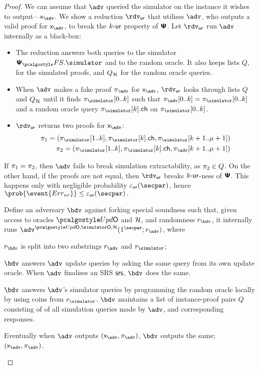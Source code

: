 \begin{proof}
{  We can assume that $\advse$ queried the simulator on the instance it wishes to
  output---$\inp_{\advse}$. We show a reduction $\rdvur$ that utilises $\advse$,
  who outputs a valid proof for $\inp_{\advse}$, to break the ${k\text{-}\mathsf{ur}}$ property of
  $\bm{\mathsf{\Psi}}$. Let $\rdvur$ run $\advse$ internally as a black-box:
\begin{itemize}
	\item The reduction answers both queries to the simulator $\psfs.\simulator$ and to the random oracle. 
	It also keeps lists $Q$, for the simulated proofs, and $Q_{\mathcal{H}}$ for the random oracle queries. 
\item When $\advse$ makes a fake proof $\zkproof_{\advse}$ for $\inp_{\advse}$,
  $\rdvur$ looks through lists $Q$ and $Q_{\mathcal{H}}$ until it finds
  $\zkproof_{\simulator}[0..k]$ such that
  $\zkproof_{\advse}[0..k] = \zkproof_{\simulator}[0..k]$
  and a random oracle query $\zkproof_{\simulator}[k].\ch$ on
  $\zkproof_{\simulator}[0..k]$.
	\item $\rdvur$ returns two proofs for $\inp_{\advse}$:
	\begin{align*}
		\zkproof_1 = (\zkproof_{\simulator}[1..k],
		\zkproof_{\simulator}[k].\ch, \zkproof_{\simulator}[k + 1..\mu + 1])\\
		\zkproof_2 = (\zkproof_{\simulator}[1..k],
		\zkproof_{\simulator}[k].\ch, \zkproof_{\advse}[k + 1..\mu + 1])
	\end{align*}
	\end{itemize}  
	If $\pi_1 = \pi_2$, then $\advse$ fails to break simulation
  extractability, as $\pi_2 \in Q$. On the other hand, if the proofs are
  not equal, then $\rdvur$ breaks ${k\text{-}\mathsf{ur}}$-ness of $\bm{\mathsf{\Psi}}$. This happens only with
  negligible probability $\epsur(\secpar)$, hence \( \prob{\event{\errur}} \leq
  \epsur(\secpar)\,. \)
}
%
		 Define an adversary $\bdv$ against forking special soundness such that, given access to oracles $\initU$ and $\mathcal{H}$, and randomness $r_\bdv$, it internally runs $\advse^{\initU, \simO, \ro} (1^\secpar; r_\adv)$, where
		\begin{compactenum}
			\item $r_\bdv$ is split into two substrings $r_\adv$ and $r_\simulator$;
			\item $\bdv$ answers $\adv$ update queries by asking the same query from its own update oracle. When $\adv$ finalises an SRS $\mathsf{srs}$, $\bdv$ does the same.
			\item $\bdv$ answers $\adv$'s simulator queries by programming the random oracle locally by using coins from $r_\simulator$.
			$\bdv$ maintains a list of instance-proof pairs $Q$ consisting of of all simulation queries made by $\adv$, and corresponding responses.
			\item Eventually when $\adv$ outputs $(\inp_\advse, \zkproof_\advse)$, $\bdv$ outputs the same; $(\inp_\advse, \zkproof_\advse)$.


\end{compactenum}
\end{proof}
